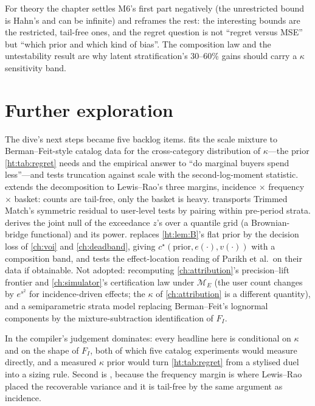 For theory the chapter settles M6's first part negatively (the unrestricted bound is Hahn's and can be infinite) and reframes the rest: the interesting bounds are the restricted, tail-free ones, and the regret question is not ``regret versus MSE'' but ``which prior and which kind of bias''. The composition law and the untestability result are why latent stratification's 30--60\% gains should carry a $\kappa$ sensitivity band.

\section{Further exploration}

The dive's next steps became five backlog items.  fits the scale mixture to Berman--Feit-style catalog data for the cross-category distribution of $\kappa$---the prior \cref{ht:tab:regret} needs and the empirical answer to ``do marginal buyers spend less''---and tests truncation against scale with the second-log-moment statistic.  extends the decomposition to Lewis--Rao's three margins, incidence $\times$ frequency $\times$ basket: counts are tail-free, only the basket is heavy.  transports Trimmed Match's symmetric residual to user-level tests by pairing within pre-period strata.  derives the joint null of the exceedance $z$'s over a quantile grid (a Brownian-bridge functional) and its power.  replaces \cref{ht:lem:B}'s flat prior by the decision loss of \cref{ch:voi} and \cref{ch:deadband}, giving $c^\star(\text{prior}, e(\cdot), v(\cdot))$ with a composition band, and tests the effect-location reading of Parikh et al.\ on their data if obtainable. Not adopted: recomputing \cref{ch:attribution}'s precision--lift frontier and \cref{ch:simulator}'s certification law under $\mathcal M_E$ (the user count changes by $e^{s^2}$ for incidence-driven effects; the $\kappa$ of \cref{ch:attribution} is a different quantity), and a semiparametric strata model replacing Berman--Feit's lognormal components by the mixture-subtraction identification of $F_I$.

In the compiler's judgement  dominates: every headline here is conditional on $\kappa$ and on the shape of $F_I$, both of which five catalog experiments would measure directly, and a measured $\kappa$ prior would turn \cref{ht:tab:regret} from a stylised duel into a sizing rule. Second is , because the frequency margin is where Lewis--Rao placed the recoverable variance and it is tail-free by the same argument as incidence.

